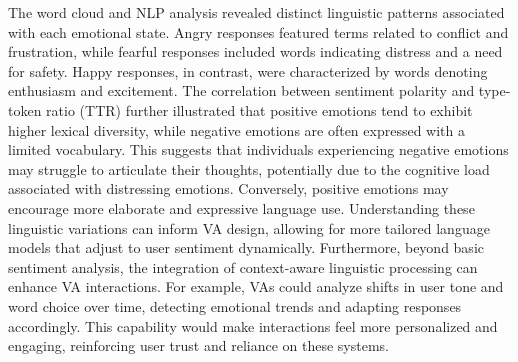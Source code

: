The word cloud and NLP analysis revealed distinct linguistic patterns associated with each emotional state. Angry responses featured terms related to conflict and frustration, while fearful responses included words indicating distress and a need for safety. Happy responses, in contrast, were characterized by words denoting enthusiasm and excitement. The correlation between sentiment polarity and type-token ratio (TTR) further illustrated that positive emotions tend to exhibit higher lexical diversity, while negative emotions are often expressed with a limited vocabulary. This suggests that individuals experiencing negative emotions may struggle to articulate their thoughts, potentially due to the cognitive load associated with distressing emotions. Conversely, positive emotions may encourage more elaborate and expressive language use. Understanding these linguistic variations can inform VA design, allowing for more tailored language models that adjust to user sentiment dynamically. Furthermore, beyond basic sentiment analysis, the integration of context-aware linguistic processing can enhance VA interactions. For example, VAs could analyze shifts in user tone and word choice over time, detecting emotional trends and adapting responses accordingly. This capability would make interactions feel more personalized and engaging, reinforcing user trust and reliance on these systems.

